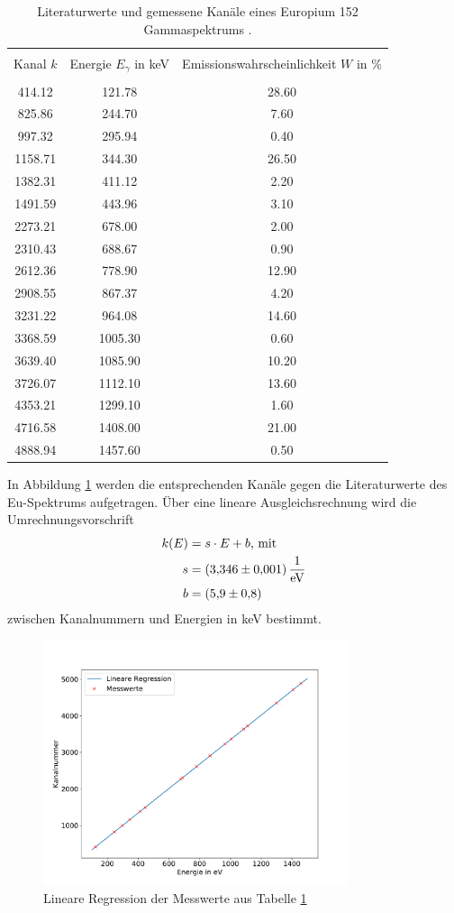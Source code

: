 \begin{table}
\centering
\caption{Literaturwerte und gemessene Kanäle eines Europium 152 Gammaspektrums \cite{sample}.}
\begin{tabular}{c c c}
\hline \\
Kanal $k$ &Energie $E_\gamma$ in keV & Emissionswahrscheinlichkeit $W$ in \% \\
\hline \\
414.12 & 121.78 & 28.60 \\ 825.86 & 244.70 & 7.60 \\ 997.32 & 295.94 & 0.40 \\ 1158.71 & 344.30 & 26.50 \\ 1382.31 & 411.12 & 2.20 \\ 1491.59 & 443.96 & 3.10 \\ 2273.21 & 678.00 & 2.00 \\ 2310.43 & 688.67 & 0.90 \\ 2612.36 & 778.90 & 12.90 \\ 2908.55 & 867.37 & 4.20 \\ 3231.22 & 964.08 & 14.60 \\ 3368.59 & 1005.30 & 0.60 \\ 3639.40 & 1085.90 & 10.20 \\ 3726.07 & 1112.10 & 13.60 \\ 4353.21 & 1299.10 & 1.60 \\ 4716.58 & 1408.00 & 21.00 \\ 4888.94 & 1457.60 & 0.50 \\ 
\hline
\end{tabular}
\label{tab:atab1}
\end{table}
In Abbildung \ref{fig:Kalibrierung} werden die entsprechenden Kanäle gegen die Literaturwerte des Eu-Spektrums aufgetragen. 
Über eine lineare Ausgleichsrechnung wird die Umrechnungsvorschrift
\begin{align*}
k(E) &= s \cdot E + b \text{, mit}\\
  s &= \SI{3.346+-0.001}{\per\electronvolt}\\
  b &= \SI{ 5.9+-0.8}{}
\end{align*}
zwischen Kanalnummern und Energien in keV bestimmt.
\begin{figure}
\centering
\includegraphics[width=0.8\textwidth]{python/plots/kalibrierung.pdf}
\caption{Lineare Regression der Messwerte aus Tabelle \ref{tab:atab1}}
\label{fig:Kalibrierung}
\end{figure}
